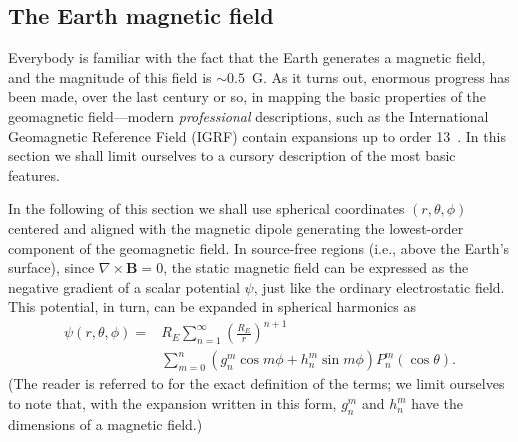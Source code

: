 \subsection{The Earth magnetic field}
\label{sec:geomagnetic_field}

Everybody is familiar with the fact that the Earth generates a magnetic field, and
the magnitude of this field is $\sim 0.5$~G. As it turns out, enormous progress
has been made, over the last century or so, in mapping the basic properties of the
geomagnetic field---modern \emph{professional} descriptions, such as the International
Geomagnetic Reference Field (IGRF) contain expansions up to order 13~\cite{2010GeoJI.183.1216F}.
In this section we shall limit ourselves to a cursory description of the most basic
features.

In the following of this section we shall use spherical coordinates
$(r, \theta, \phi)$ centered and aligned with the magnetic
dipole generating the lowest-order component of the geomagnetic field.
In source-free regions (i.e., above the Earth's surface), since
$\nabla \times {\mathbf B} = 0$, the static magnetic field can be expressed as
the negative gradient of a scalar potential $\psi$, just like the ordinary
electrostatic field. This potential, in turn, can be expanded in spherical
harmonics as
\begin{align}\label{eq:geomag_expansion}
  \psi(r, \theta, \phi) =&
  R_E \sum_{n=1}^{\infty}\left(\frac{R_E}{r}\right)^{n+1}\nonumber\\
  &\sum_{m=0}^{n}(g_n^m\cos m\phi + h_n^m\sin m\phi)P_n^m(\cos\theta).
\end{align}
(The reader is referred to \cite{Walt} for the exact definition of the
terms; we limit ourselves to note that, with the expansion written in this
form, $g_n^m$ and $h_n^m$ have the dimensions of a magnetic field.)


